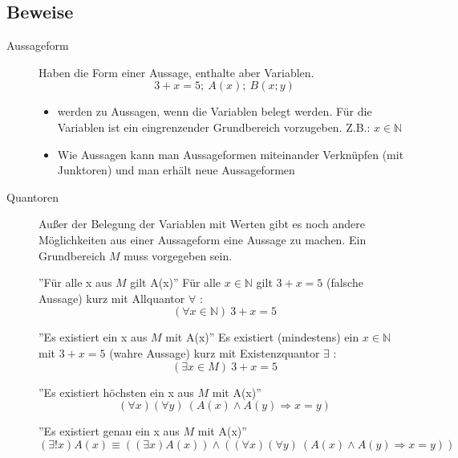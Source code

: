 \subsection{Beweise}
\begin{description}
    \item[Aussageform] Haben die Form einer Aussage, enthalte aber Variablen.
    $$3 + x = 5;\ A(x);\ B(x;y)$$
    \begin{itemize}
        \item werden zu Aussagen, wenn die Variablen belegt werden. Für die Variablen ist ein eingrenzender Grundbereich vorzugeben. Z.B.: $x \in \mathbb{N}$
        \item Wie Aussagen kann man Aussageformen miteinander Verknüpfen (mit Junktoren) und man erhält neue Aussageformen
    \end{itemize}
    \item[Quantoren] Außer der Belegung der Variablen mit Werten gibt es noch andere Möglichkeiten aus einer Aussageform eine Aussage zu machen. Ein Grundbereich $M$ muss vorgegeben sein.

    ''Für alle x aus $M$ gilt A(x)'' \newline
    Für alle $x \in \mathbb{N}$ gilt $3 + x = 5$ (falsche Aussage) kurz mit Allquantor $\forall$ :
    $$(\forall x \in \mathbb{N})\ 3 + x = 5$$

    ''Es existiert ein x aus $M$ mit A(x)'' \newline
    Es existiert (mindestens) ein $x \in \mathbb{N}$ mit $3 + x = 5$ (wahre Aussage) kurz mit Existenzquantor $\exists$ :
    $$(\exists x \in M)\ 3 + x = 5$$

    ''Es existiert höchsten ein x aus $M$ mit A(x)''
    $$(\forall x)(\forall y)\ (A(x) \wedge A(y) \Rightarrow x = y)$$

    ''Es existiert genau ein x aus $M$ mit A(x)''
    $$(\exists ! x) A(x) \equiv ((\exists x) A(x)) \wedge ((\forall x)(\forall y)\ (A(x) \wedge A(y) \Rightarrow x = y))$$
\end{description}
